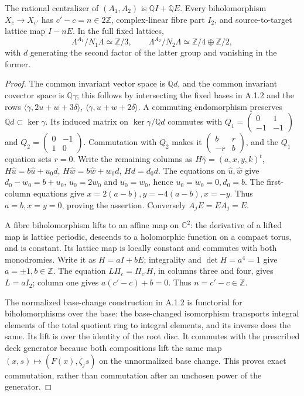 \begin{proposition}[A.2.1; Proved]\label{st:A.2.1}
The rational centralizer of $(A_1,A_2)$ is $\mathbb QI+\mathbb QE$. Every biholomorphism $X_c\to X_{c'}$ has $c'-c=n\in2\mathbb Z$, complex-linear fibre part $I_2$, and source-to-target lattice map $I-nE$. In the full fixed lattices,
\[
 \Lambda^{A_1}/N_1\Lambda\simeq\mathbb Z/3,\qquad
 \Lambda^{A_2}/N_2\Lambda\simeq\mathbb Z/4\oplus\mathbb Z/2,
\]
with $d$ generating the second factor of the latter group and vanishing in the former.
\end{proposition}
\begin{proof}
The common invariant vector space is $\mathbb Qd$, and the common invariant covector space is $\mathbb Q\gamma$; this follows by intersecting the fixed bases in A.1.2 and the rows $\langle\gamma,2u+w+3\delta\rangle$, $\langle\gamma,u+w+2\delta\rangle$. A commuting endomorphism preserves $\mathbb Qd\subset\ker\gamma$. Its induced matrix on $\ker\gamma/\mathbb Qd$ commutes with
$Q_1=\left(\begin{smallmatrix}0&1\\-1&-1\end{smallmatrix}\right)$ and $Q_2=\left(\begin{smallmatrix}0&-1\\1&0\end{smallmatrix}\right)$. Commutation with $Q_2$ makes it $\left(\begin{smallmatrix}b&r\\-r&b\end{smallmatrix}\right)$, and the $Q_1$ equation sets $r=0$. Write the remaining columns as
$H\widehat\gamma=(a,x,y,k)^t$, $H\widehat u=b\widehat u+u_0d$, $H\widehat w=b\widehat w+w_0d$, $Hd=d_0d$. The equations on $\widehat u,\widehat w$ give $d_0-w_0=b+u_0$, $u_0=2w_0$ and $u_0=w_0$, hence $u_0=w_0=0,d_0=b$. The first-column equations give $x=2(a-b),y=-4(a-b),x=-y$. Thus $a=b,x=y=0$, proving the assertion. Conversely $A_jE=EA_j=E$.

A fibre biholomorphism lifts to an affine map on $\mathbb C^2$: the derivative of a lifted map is lattice periodic, descends to a holomorphic function on a compact torus, and is constant. Its lattice map is locally constant and commutes with both monodromies. Write it as $H=aI+bE$; integrality and $\det H=a^4=1$ give $a=\pm1,b\in\mathbb Z$. The equation $L\Pi_c=\Pi_{c'}H$, in columns three and four, gives $L=aI_2$; column one gives $a(c'-c)+b=0$. Thus $n=c'-c\in\mathbb Z$.

The normalized base-change construction in A.1.2 is functorial for biholomorphisms over the base: the base-changed isomorphism transports integral elements of the total quotient ring to integral elements, and its inverse does the same. Its lift is over the identity of the root disc. It commutes with the prescribed deck generator because both compositions lift the same map $(x,s)\mapsto(F(x),\zeta_js)$ on the unnormalized base change. This proves exact commutation, rather than commutation after an unchosen power of the generator.


\end{proof}
